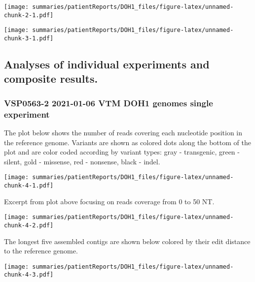 \documentclass[12pt,]{article}
\begin{document}
\vspace{0.5cm}

\texttt{[image: summaries/patientReports/DOH1\_files/figure-latex/unnamed-chunk-2-1.pdf]}

\newpage

\texttt{[image: summaries/patientReports/DOH1\_files/figure-latex/unnamed-chunk-3-1.pdf]}

\newpage

\subsection{Analyses of individual experiments and composite
results.}\label{analyses-of-individual-experiments-and-composite-results.}

\subsubsection{VSP0563-2 \textbar{} 2021-01-06 \textbar{} VTM \textbar{}
DOH1 \textbar{} genomes \textbar{} single
experiment}\label{vsp0563-2-2021-01-06-vtm-doh1-genomes-single-experiment}

The plot below shows the number of reads covering each nucleotide
position in the reference genome. Variants are shown as colored dots
along the bottom of the plot and are color coded according by variant
types: gray - transgenic, green - silent, gold - missense, red -
nonsense, black - indel.

\vspace{0.23cm}

\texttt{[image: summaries/patientReports/DOH1\_files/figure-latex/unnamed-chunk-4-1.pdf]}

\vspace{0.35cm}

\vspace{0.25cm} Excerpt from plot above focusing on reads coverage from
0 to 50 NT.

\vspace{0.25cm}

\texttt{[image: summaries/patientReports/DOH1\_files/figure-latex/unnamed-chunk-4-2.pdf]}

\vspace{0.50cm}

\vspace{0.25cm} The longest five assembled contigs are shown below
colored by their edit distance to the reference genome.

\vspace{0.25cm}

\texttt{[image: summaries/patientReports/DOH1\_files/figure-latex/unnamed-chunk-4-3.pdf]}
\newpage
\newpage
\end{document}
